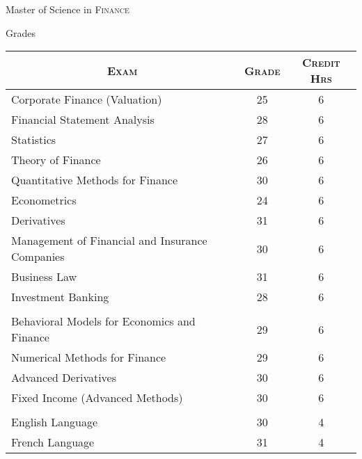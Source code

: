 \documentclass[a4paper,10pt]{article}
\begin{document}
\newpage
\par{\centering\Large \hypertarget{grds}{Master of Science in \textsc{Finance}}\par}\large{\centering Grades\par}\normalsize
\begin{center}
  \begin{tabular}{lcc}
    \multicolumn{1}{c}{\textsc{Exam}}               & \textsc{Grade} & \textsc{Credit Hrs} \\ \hline
    Corporate Finance (Valuation)                   & 25             & 6                   \\
    Financial Statement Analysis                    & 28             & 6                   \\
    Statistics                                      & 27             & 6                   \\
    Theory of Finance                               & 26             & 6                   \\
    Quantitative Methods for Finance                & 30             & 6                   \\
    Econometrics                                    & 24             & 6                   \\
    Derivatives                                     & 31             & 6                   \\
    Management of Financial and Insurance Companies & 30             & 6                   \\
    Business Law                                    & 31             & 6                   \\
    Investment Banking                              & 28             & 6                   \\
      \\

    Behavioral Models for Economics and Finance     & 29             & 6                   \\
    Numerical Methods for Finance                   & 29             & 6                   \\
    Advanced Derivatives                            & 30             & 6                   \\
    Fixed Income (Advanced Methods)                 & 30             & 6                   \\
      \\

    English Language                                & 30             & 4                   \\
    French Language                                 & 31             & 4                   \\


\end{tabular}
\end{center}
\end{document}
